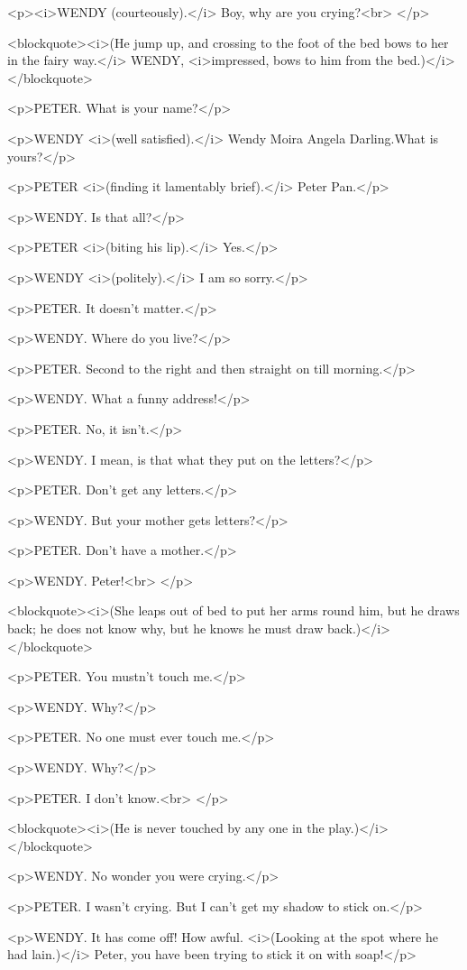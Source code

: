 <p><i>WENDY (courteously).</i> Boy, why are you crying?<br>
</p>

<blockquote><i>(He jump up, and crossing to the foot of the bed bows
to her in the fairy way.</i> WENDY, <i>impressed, bows to him from
the bed.)</i></blockquote>

<p>PETER. What is your name?</p>

<p>WENDY <i>(well satisfied).</i> Wendy Moira Angela Darling.What is
yours?</p>

<p>PETER <i>(finding it lamentably brief).</i> Peter Pan.</p>

<p>WENDY. Is that all?</p>

<p>PETER <i>(biting his lip).</i> Yes.</p>

<p>WENDY <i>(politely).</i> I am so sorry.</p>

<p>PETER. It doesn't matter.</p>

<p>WENDY. Where do you live?</p>

<p>PETER. Second to the right and then straight on till morning.</p>

<p>WENDY. What a funny address!</p>

<p>PETER. No, it isn't.</p>

<p>WENDY. I mean, is that what they put on the letters?</p>

<p>PETER. Don't get any letters.</p>

<p>WENDY. But your mother gets letters?</p>

<p>PETER. Don't have a mother.</p>

<p>WENDY. Peter!<br>
</p>

<blockquote><i>(She leaps out of bed to put her arms round him, but
he draws back; he does not know why, but he knows he must draw
back.)</i></blockquote>

<p>PETER. You mustn't touch me.</p>

<p>WENDY. Why?</p>

<p>PETER. No one must ever touch me.</p>

<p>WENDY. Why?</p>

<p>PETER. I don't know.<br>
</p>

<blockquote><i>(He is never touched by any one in the
play.)</i></blockquote>

<p>WENDY. No wonder you were crying.</p>

<p>PETER. I wasn't crying. But I can't get my shadow to stick on.</p>

<p>WENDY. It has come off! How awful. <i>(Looking at the spot where
he had lain.)</i> Peter, you have been trying to stick it on with
soap!</p>

